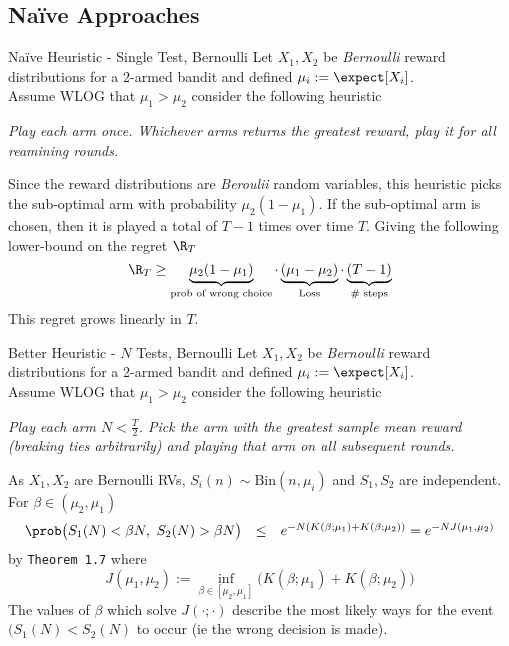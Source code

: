 \documentclass[11pt,a4paper]{article}
\begin{document}
\subsection{Na\"ive Approaches} %

  \begin{proposition}{Na\"ive Heuristic - Single Test, Bernoulli}
    Let $X_1,X_2$ be \textit{Bernoulli} reward distributions for a 2-armed bandit and defined $\mu_i:=\expect[X_i]$.\\
    Assume WLOG that $\mu_1>\mu_2$ consider the following heuristic
    \begin{center}
      \textit{Play each arm once. Whichever arms returns the greatest reward, play it for all reamining rounds.}
    \end{center}
    Since the reward distributions are \textit{Beroulii} random variables, this heuristic picks the sub-optimal arm with probability $\mu_2(1-\mu_1)$. If the sub-optimal arm is chosen, then it is played a total of $T-1$ times over time $T$. Giving the following lower-bound on the regret $\R_T$
    \[ \R_T\geq\underbrace{\mu_2(1-\mu_1)}_{\tiny\text{prob of wrong choice}}\cdot\underbrace{(\mu_1-\mu_2)}_{\tiny\text{Loss}}\cdot\underbrace{(T-1)}_{\tiny\text{\# steps}} \]
    This regret grows linearly in $T$.
  \end{proposition}

  \begin{proposition}{Better Heuristic - $N$ Tests, Bernoulli}
    Let $X_1,X_2$ be \textit{Bernoulli} reward distributions for a 2-armed bandit and defined $\mu_i:=\expect[X_i]$.\\
    Assume WLOG that $\mu_1>\mu_2$ consider the following heuristic
    \begin{center}
      \textit{Play each arm $N<\frac{T}2$. Pick the arm with the greatest sample mean reward (breaking ties arbitrarily) and playing that arm on all subsequent rounds.}
    \end{center}
    As $X_1,X_2$ are Bernoulli RVs, $S_i(n)\sim\text{Bin}(n,\mu_i)$ and $S_1,S_2$ are independent.\\
    For $\beta\in(\mu_2,\mu_1)$
    \[\begin{array}{rcl}
      \prob\big(S_1(N)<\beta N,\ S_2(N)>\beta N\big)&\leq&e^{-N(K(\beta;\mu_1)+K(\beta;\mu_2))}=e^{-NJ(\mu_1,\mu_2)}
    \end{array}\]
    by \texttt{Theorem 1.7} where
    \[ J(\mu_1,\mu_2):=\inf_{\beta\in[\mu_2,\mu_1]}\big(K(\beta;\mu_1)+K(\beta;\mu_2)\big) \]
    The values of $\beta$ which solve $J(\cdot;\cdot)$ describe the most likely ways for the event $(S_1(N)<S_2(N)$ to occur (ie the wrong decision is made).
  \end{proposition}
\end{document}
